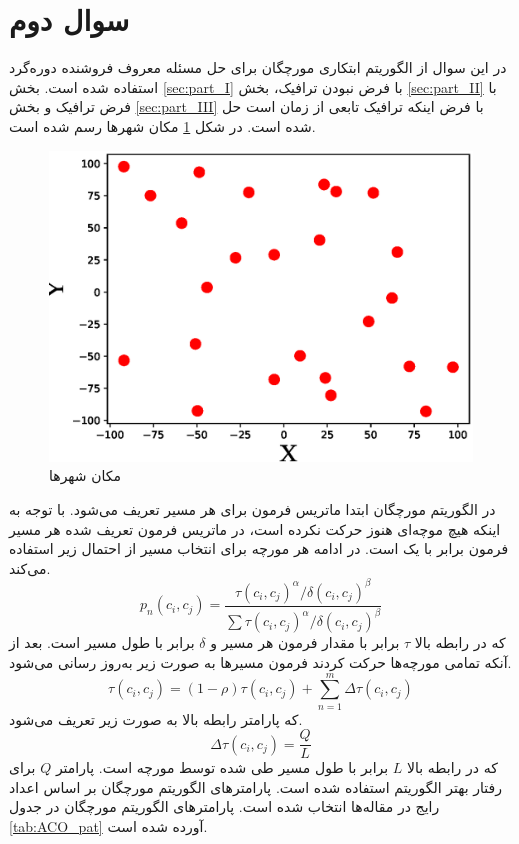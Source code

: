 \section{سوال دوم}
در این سوال از الگوریتم ابتکاری مورچگان برای حل مسئله معروف فروشنده دوره‌گرد استفاده شده است. بخش
\ref{sec:part_I}
با فرض نبودن ترافیک،
بخش
\ref{sec:part_II}
با فرض ترافیک و بخش
\ref{sec:part_III}
با فرض اینکه ترافیک تابعی از زمان است حل شده است. در شکل
\ref{fig:cities}
مکان شهر‌ها رسم شده است.
\begin{figure}[H]\label{fig:cities}
	\caption{مکان شهرها} 
	\centering 
	\includegraphics[width=16cm]{../Figure/Q2/Cities} 
\end{figure}


در الگوریتم مورچگان ابتدا ماتریس فرمون برای هر مسیر تعریف می‌شود. با توجه به اینکه هیچ موچه‌ای هنوز حرکت نکرده است، در ماتریس فرمون تعریف شده هر مسیر فرمون برابر با یک است. در ادامه هر مورچه برای انتخاب مسیر از احتمال زیر استفاده می‌کند.
\begin{equation}
	p_n(c_i, c_j) = \dfrac{\tau(c_i, c_j)^{\alpha}/\delta(c_i, c_j)^{\beta}}{\sum \tau(c_i, c_j)^{\alpha}/\delta(c_i, c_j)^{\beta}}
\end{equation}
که در رابطه بالا $\tau$ برابر با مقدار فرمون هر مسیر و $\delta$ برابر با طول مسیر است. بعد از آنکه تمامی مورچه‌ها حرکت کردند فرمون مسیر‌ها به صورت زیر به‌روز رسانی می‌شود.
\begin{equation}
	\tau(c_i, c_j) = (1-\rho)\tau(c_i, c_j) + \sum_{n=1}^{m} \Delta \tau(c_i, c_j) 
\end{equation}
که پارامتر رابطه بالا به صورت زیر تعریف می‌شود.
\begin{equation}
	\Delta \tau(c_i, c_j) = \dfrac{Q}{L}
\end{equation}
که در رابطه بالا $L$ برابر با طول مسیر طی شده توسط مورچه است. 
پارامتر $Q$ برای رفتار بهتر الگوریتم استفاده شده است.
پارامترهای الگوریتم مورچگان بر اساس اعداد رایج در مقاله‌ها انتخاب شده است. پارامترهای الگوریتم مورچگان در جدول
\ref{tab:ACO_pat}
آورده شده است.

